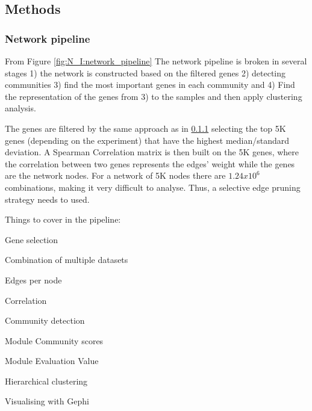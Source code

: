 \subsection{Methods} 

\subsubsection{Network pipeline}

From Figure \ref{fig:N_I:network_pipeline} The network pipeline is broken in several stages 1) the network is constructed based on the filtered genes 2) detecting  communities 3) find the most important genes in each community and 4) Find the representation of the genes from 3) to the samples and then apply clustering analysis. 


The genes are filtered by the same approach as in \ref{} selecting the top 5K genes (depending on the experiment) that have the highest median/standard deviation. A Spearman Correlation matrix is then built on the 5K genes, where the correlation between two genes represents the edges' weight while the genes are the network nodes. For a network of 5K nodes there are $1.24x10^6$ combinations, making it very difficult to analyse. Thus, a selective edge pruning strategy needs to used.





\newline
Things to cover in the pipeline:
\begin{todolist}
    \item Gene selection
    \item Combination of multiple datasets
    \item Edges per node
    \item Correlation
    \item Community detection
    \item Module Community scores
    \item Module Evaluation Value
    \item Hierarchical clustering
    \item Visualising with Gephi
\end{todolist}

